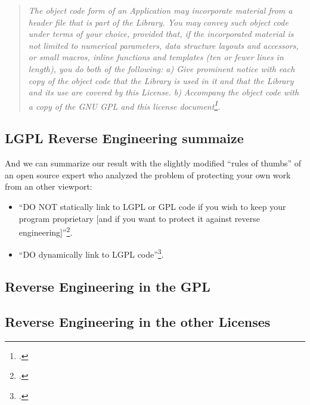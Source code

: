 \begin{quote}\emph{The object code form of an Application may incorporate
material from a header file that is part of the Library. You may convey such
object code under terms of your choice, provided that, if the incorporated
material is not limited to numerical parameters, data structure layouts and
accessors, or small macros, inline functions and templates (ten or fewer lines
in length), you do both of the following: a) Give prominent notice with each
copy of the object code that the Library is used in it and that the Library and
its use are covered by this License. b) Accompany the object code with a copy of
the GNU GPL and this license document\footcite[cf.][\nopage wp.,
§3]{Lgpl30OsiLicense2007a}.}
\end{quote}



\subsection{LGPL Reverse Engineering summaize}

And we can summarize our result
with the slightly modified \enquote{rules of thumbs} of an open source expert
who analyzed the problem of protecting your own work from an other viewport:

\begin{itemize}
  \item \enquote{DO NOT statically link to LGPL or GPL code if you wish to keep
  your program proprietary [and if you want to protect it against reverse
  engineering]}\footcite[cf.][6]{Ilardi2010a}.
  \item \enquote{DO dynamically link to LGPL
  code}\footcite[cf.][6]{Ilardi2010a}.
\end{itemize}



\subsection{Reverse Engineering in the GPL}

\subsection{Reverse Engineering in the other Licenses}













%
